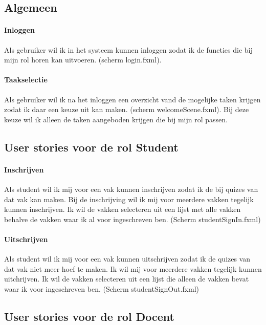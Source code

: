 \documentclass[11pt, a4paper]{article}
\begin{document}
\subsection{Algemeen}

\paragraph{Inloggen}
Als gebruiker wil ik in het systeem kunnen inloggen zodat ik de functies die bij mijn rol horen kan uitvoeren. (scherm login.fxml).

\paragraph{Taakselectie}
Als gebruiker wil ik na het inloggen een overzicht vand de mogelijke taken krijgen zodat ik daar een keuze uit kan maken. (scherm welcomeScene.fxml).
Bij deze keuze wil ik alleen de taken aangeboden krijgen die bij mijn rol passen.

\subsection{User stories voor de rol Student}

\paragraph{Inschrijven}
Als student wil ik mij voor een vak kunnen inschrijven zodat ik de bij quizes van dat vak kan maken.
Bij de inschrijving wil ik mij voor meerdere vakken tegelijk kunnen inschrijven.
Ik wil de vakken selecteren uit een lijst met alle vakken behalve de vakken waar ik al voor ingeschreven ben.
(Scherm studentSignIn.fxml)

\paragraph{Uitschrijven}
Als student wil ik mij voor een vak kunnen uitschrijven zodat ik de quizes van dat vak niet meer hoef te maken.
Ik wil mij voor meerdere vakken tegelijk kunnen uitchrijven.
Ik wil de vakken selecteren uit een lijst die alleen de vakken bevat waar ik voor ingeschreven ben.
(Scherm studentSignOut.fxml)

\subsection{User stories voor de rol Docent}
\end{document}
